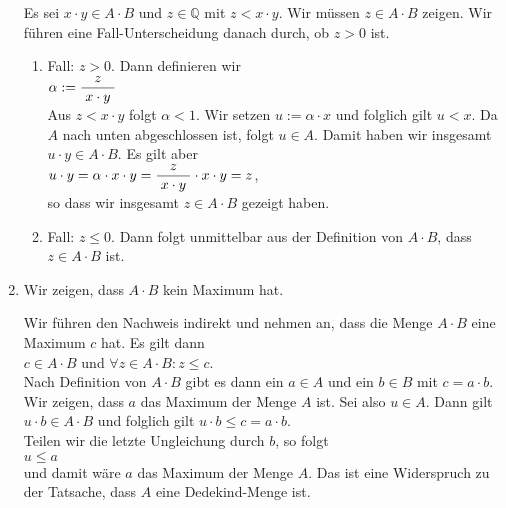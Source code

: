 \begin{enumerate}
      Es sei $x \cdot y \in A \cdot B$ und $z \in \mathbb{Q}$ mit $z < x \cdot y$.  
      Wir müssen $z \in A \cdot B$ zeigen.  
      Wir führen eine Fall-Unterscheidung danach durch, ob $z > 0$ ist.
      \begin{enumerate}
      \item Fall: $z > 0$.  Dann definieren wir
            \\[0.2cm]
            \hspace*{1.3cm}
            $\alpha := \displaystyle\frac{\;\displaystyle z\;}{\;\displaystyle x \cdot y\;}$
            \\[0.2cm]
            Aus $z < x \cdot y$ folgt $\alpha < 1$.  Wir setzen $u := \alpha \cdot x$
            und folglich gilt $u < x$.  Da $A$ nach unten abgeschlossen ist, folgt $u \in A$.
            Damit haben wir insgesamt $u \cdot y \in A \cdot B$.  Es gilt aber
            \\[0.2cm]
            \hspace*{1.3cm}
            $u \cdot y = \alpha \cdot x \cdot y = \displaystyle\frac{\;\displaystyle z\;}{\;\displaystyle x \cdot y\;} \cdot x \cdot y = z$,
            \\[0.2cm]
            so dass wir insgesamt $z \in A \cdot B$ gezeigt haben.
      \item Fall: $z \leq 0$.  Dann folgt unmittelbar aus der Definition von $A \cdot B$, dass 
            $z \in A \cdot B$  ist.
      \end{enumerate}
\item Wir zeigen, dass $A \cdot B$ kein Maximum hat.  

      Wir führen den Nachweis indirekt und nehmen an, dass die Menge $A \cdot B$ eine Maximum $c$ hat.
      Es gilt dann 
      \\[0.2cm]
      \hspace*{1.3cm}
      $c \in A \cdot B$ \quad und \quad $\forall z \in A \cdot B: z \leq c$.
      \\[0.2cm]
      Nach Definition von $A \cdot B$ gibt es dann ein $a \in A$ und ein $b \in B$ mit $c = a \cdot b$.
      Wir zeigen, dass $a$ das Maximum der Menge $A$ ist.  Sei also $u \in A$.  Dann gilt
      \\[0.2cm]
      \hspace*{1.3cm}
      $u \cdot b \in A \cdot B$ \quad und folglich gilt \quad $u \cdot b \leq c = a \cdot b$.
      \\[0.2cm]
      Teilen wir die letzte Ungleichung durch $b$, so folgt
      \\[0.2cm]
      \hspace*{1.3cm}
      $u \leq a$
      \\[0.2cm]
      und damit wäre $a$ das Maximum der Menge $A$.  Das ist eine Widerspruch zu der Tatsache, dass
      $A$ eine Dedekind-Menge ist.
\end{enumerate}
